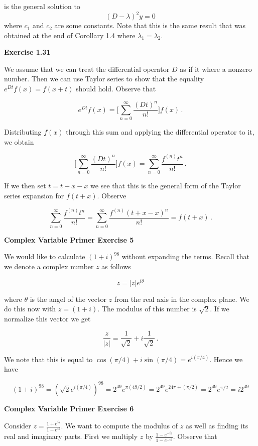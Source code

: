 \documentclass[a4paper]{article}
\numberwithin{equation}{section}
\begin{document}
\begin{description}
is the general solution to $$(D-\lambda)^2y= 0$$ where $c_1$ and $c_2$ are some constants. Note that this is the same result that was obtained at the end of Corollary 1.4 where $\lambda_1 = \lambda_2$.

\item \textbf{Exercise 1.31}

\item We assume that we can treat the differential operator $D$ as if it where a nonzero number. Then we can use Taylor series to show that the equality $e^{Dt}f(x) = f(x+t)$ should hold. Observe that

$$e^{Dt}f(x) = \Big[\sum_{n=0}^\infty \frac{(Dt)^n}{n!}\Big]f(x)\,.$$

Distributing $f(x)$ through this sum and applying the differential operator to it, we obtain

$$\Big[\sum_{n=0}^\infty \frac{(Dt)^n}{n!}\Big]f(x) = \sum_{n=0}^\infty \frac{f^{(n)}t^n}{n!}\,.$$

If we then set $t = t +x -x$ we see that this is the general form of the Taylor series expansion for $f(t+x)$. Observe

$$\sum_{n=0}^\infty \frac{f^{(n)}t^n}{n!} = \sum_{n=0}^\infty \frac{f^{(n)}(t+x-x)^n}{n!} = f(t+x)\,.$$

\item \textbf{Complex Variable Primer Exercise 5}

\item We would like to calculate $(1+i)^{98}$ without expanding the terms. Recall that we denote a complex number $z$ as follows

$$z = |z|e^{i\theta}$$

where $\theta$ is the angel of the vector $z$ from the real axis in the complex plane. We do this now with $z = (1+i)$. The modulus of this number is $\sqrt{2}$. If we normalize this vector we get

$$\frac{z}{|z|} = \frac{1}{\sqrt{2}} + i\frac{1}{\sqrt{2}}\,.$$

We note that this is equal to $\cos(\pi/4) + i\sin(\pi/4) = e^{i(\pi/4)}$. Hence we have

$$(1+i)^{98} = (\sqrt{2}e^{i(\pi/4)})^{98} = 2^{49}e^{\pi(49/2)} = 2^{49}e^{24\pi + (\pi/2)} = 2^{49}e^{\pi/2} = i2^{49}$$

\item \textbf{Complex Variable Primer Exercise 6}

\item Consider $z = \frac{1+e^{i\theta}}{1-e^{i\theta}}$. We want to compute the modulus of $z$ as well as finding its real and imaginary parts. First we multiply $z$ by $\frac{1-e^{-i\theta}}{1-e^{-i\theta}}$. Observe that


\end{description}
\end{document}

